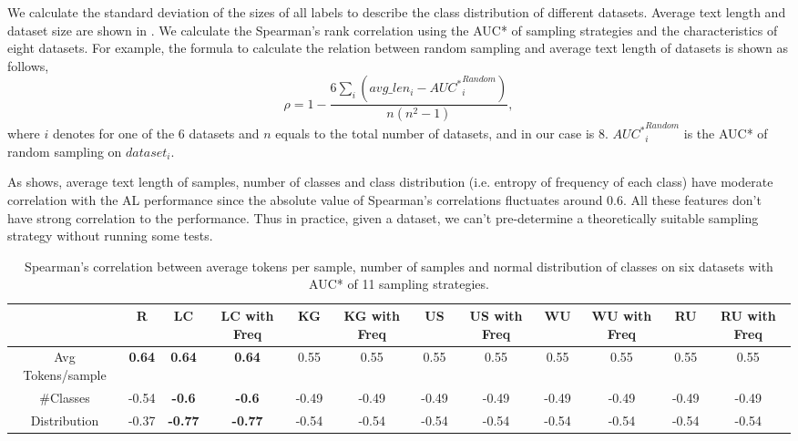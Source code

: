 We calculate the standard deviation of the sizes of all labels to describe the class distribution of different datasets. Average text length and dataset size are shown in .  We calculate the Spearman's rank correlation using the AUC* of sampling strategies and the characteristics of eight datasets. For example, the formula to calculate the relation between random sampling and average text length of datasets is shown as follows,
\begin{equation}
    \rho = 1 - \frac{6\sum_i(avg\_len_i - {AUC^*}^{Random}_{i})}{n(n^2 - 1)},
\end{equation}
where $i$ denotes for one of the 6 datasets and $n$ equals to the total number of datasets, 
and in our case is 8. ${AUC^*}^{Random}_{i}$ is the AUC* of random sampling on $dataset_i$.

As  shows, average text length of samples, number of classes and class distribution (i.e. entropy of frequency of each class) have moderate correlation with the AL performance since the absolute value of Spearman's correlations fluctuates around 0.6. All these features don't have strong correlation to the performance. Thus in practice, given a dataset, we can't pre-determine a theoretically suitable sampling strategy without 
running some tests.

\begin{table}[th]
	\scriptsize
	\centering
	\begin{tabular}{cccccccccccc}
		\toprule
		 &  R & LC & LC with Freq & KG & KG with Freq & US & US with Freq & WU & WU with Freq & RU & RU with Freq\\\hline
		Avg Tokens/sample & \textbf{0.64} & \textbf{0.64} & \textbf{0.64} & 0.55 & 0.55 & 0.55 & 0.55 & 0.55 & 0.55 & 0.55 & 0.55 \\
		\#Classes & -0.54 & \textbf{-0.6} & \textbf{-0.6} & -0.49 & -0.49 & -0.49 & -0.49 & -0.49 & -0.49 &-0.49 & -0.49\\
		Distribution & -0.37 & \textbf{-0.77} &\textbf{ -0.77} & -0.54 & -0.54 & -0.54 & -0.54 & -0.54 & -0.54 & -0.54& -0.54 \\ 
		\bottomrule              
	\end{tabular}
\caption{Spearman's correlation between average tokens per sample, number of samples and normal distribution of classes on six datasets with AUC* of 11 sampling strategies.}
\label{table:correkationOfDataset}
\end{table}

